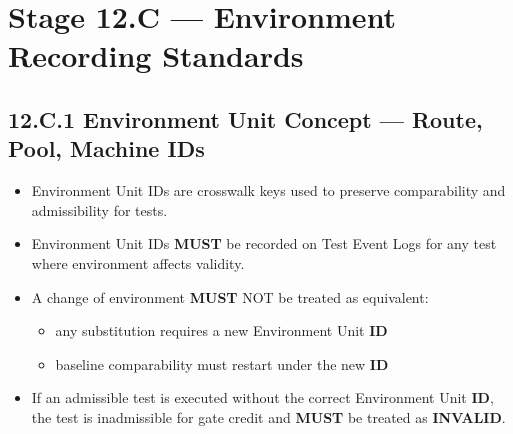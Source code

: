 \documentclass[10pt]{article}
\begin{document}
\section*{Stage 12.C — Environment Recording Standards}
{}

\subsection*{12.C.1 Environment Unit Concept — Route, Pool, Machine IDs}
{}

\begin{itemize}
\item Environment Unit IDs are crosswalk keys used to preserve comparability and admissibility for tests.
\item Environment Unit IDs \textbf{MUST} be recorded on Test Event Logs for any test where environment affects validity.
\item A change of environment \textbf{MUST} NOT be treated as equivalent:
\begin{itemize}
\item any substitution requires a new Environment Unit \textbf{ID}
\item baseline comparability must restart under the new \textbf{ID}
\end{itemize}
\item If an admissible test is executed without the correct Environment Unit \textbf{ID}, the test is inadmissible for gate credit and \textbf{MUST} be treated as \textbf{INVALID}.
\end{itemize}
\end{document}
